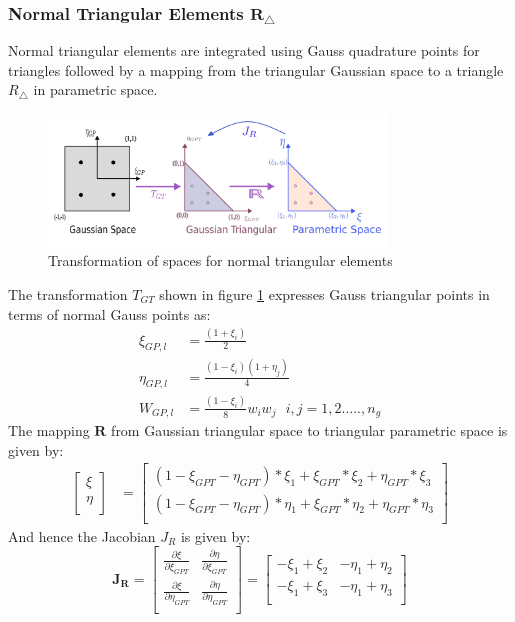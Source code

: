 \documentclass[12pt, a4paper]{report}
\begin{document}
\subsubsection{Normal Triangular Elements $\boldsymbol{R_{\triangle}}$}
Normal triangular elements \cite{trim_element_iga_normal} are integrated using Gauss quadrature points for triangles followed by a mapping from the triangular Gaussian space to a triangle $R_{\triangle}$ in parametric space.
\begin{figure}[H]
\centering
\includegraphics[width=0.8\textwidth]{Images/gauss_triangle_trans.jpg}
\caption{Transformation of spaces for normal triangular elements}
\label{fig:Gauss_TRIANGLES}
\end{figure}
The transformation $T_{GT}$ shown in figure \ref{fig:Gauss_TRIANGLES} expresses Gauss triangular points in terms of normal Gauss points as:
\begin{align}
    \xi_{GP,l} &= \frac{(1+\xi_i)}{2} \\
    \eta_{GP,l} &= \frac{(1-\xi_i)(1+\eta_j)}{4} \\
    W_{GP,l} &= \frac{(1-\xi_i)}{8}w_iw_j~~~i,j= 1,2.....,n_g 
\end{align}
The mapping $\boldsymbol{R}$ from Gaussian triangular space to  triangular parametric space is given by:
\begin{align}
    \begin{bmatrix}
    \xi \\
    \eta \\
  \end{bmatrix}
  &=
  \begin{bmatrix}
    (1-\xi_{GPT}-\eta_{GPT})*\xi_1 + \xi_{GPT}*\xi_2 + \eta_{GPT}*\xi_3 \\
    (1-\xi_{GPT}-\eta_{GPT})*\eta_1 + \xi_{GPT}*\eta_2 + \eta_{GPT}*\eta_3 \\
  \end{bmatrix}
\end{align}
And hence the Jacobian $J_R$ is given by:
\begin{equation}
  \boldsymbol{J_R}= \begin{bmatrix}    \frac{\partial \xi}{\partial \xi_{GPT}}& \frac{\partial \eta}{\partial \xi_{GPT}} \\
\frac{\partial \xi}{\partial \eta_{GPT}} &\frac{\partial \eta}{\partial \eta_{GPT}} \\\end{bmatrix}=\begin{bmatrix}    -\xi_1 + \xi_2& - \eta_1 + \eta_2 \\
 -\xi_1 + \xi_3 &- \eta_1 + \eta_3 \\\end{bmatrix}
\end{equation}
\end{document}
